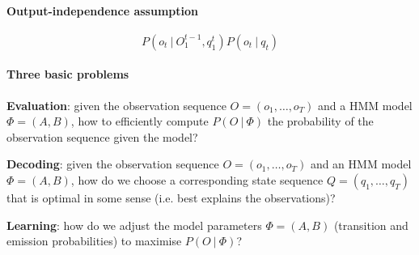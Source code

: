 \documentclass[10pt]{report}
\begin{document}
\paragraph{Output-independence assumption} $$P(o_t\:|\:O_1^{t-1},q_1^t)P(o_t\:|\:q_t)$$
\paragraph{Three basic problems}
\begin{list}{}{}
	\item \textbf{Evaluation}: given the observation sequence $O = (o_1,\ldots,o_T)$ and a HMM model $\Phi = (A, B)$, how to efficiently compute $P(O\:|\:\Phi)$ the probability of the observation sequence given the model?
	\item \textbf{Decoding}: given the observation sequence $O = (o_1,\ldots,o_T)$ and an HMM model $\Phi = (A, B)$, how do we choose a corresponding state sequence $Q = (q_1,\ldots,q_T)$ that is optimal in some sense (i.e. best explains the observations)?
	\item \textbf{Learning}: how do we adjust the model parameters $\Phi = (A,B)$ (transition and emission probabilities) to maximise $P(O\:|\:\Phi)$?
\end{list}
\end{document}
